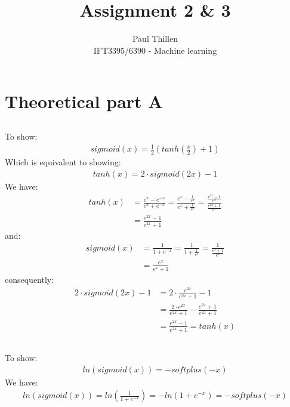 \documentclass[12pt]{article}
\begin{document}
 

 
\title{Assignment 2 \& 3}%
\author{Paul Thillen\\ %
IFT3395/6390 - Machine learning} %
 
\maketitle
 
\section{Theoretical part A}
\subsection{}
To show: 
\begin{align*}
sigmoid(x)=\frac{1}{2} ( tanh(\frac{x}{2})+1)
\end{align*}
Which is equivalent to showing:
\begin{align*}
tanh(x) = 2 \cdot sigmoid(2x)-1
\end{align*}
We have:
\begin{align*}
tanh(x) & = \frac{e^x-e^{-x}}{e^x+e^{-x}} = \frac{e^x-\frac{1}{e^x}}{e^x+\frac{1}{e^x}} = \frac{\frac{e^{2x}-1}{e^x}}{\frac{e^{2x}+1}{e^x}} \\
& = \frac{e^{2x}-1}{e^{2x}+1}
\end{align*}
and:
\begin{align*}
sigmoid(x) &= \frac{1}{1+e^{-x}} =  \frac{1}{1+\frac{1}{e^{x}}} = \frac{1}{\frac{e^x+1}{e^x}} \\
& = \frac{e^x}{e^x+1}
\end{align*}
consequently:
\begin{align*}
2 \cdot sigmoid(2x) - 1 & = 2 \cdot \frac{ e^{2x}}{e^{2x}+1}-1 \\
& = \frac{ 2 \cdot e^{2x}}{e^{2x}+1}- \frac{e^{2x}+1}{e^{2x}+1} \\
& = \frac{e^{2x}-1}{e^{2x}+1} = tanh(x)
\end{align*}
\subsection{}
To show:
\begin{align*}
ln(sigmoid(x)) = -softplus(-x)
\end{align*}
We have:
\begin{align*}
ln(sigmoid(x)) = ln ( \frac{1}{1+e^{-x}} ) = - ln( 1+e^{-x} ) = - softplus(-x)
\end{align*}
\end{document}
